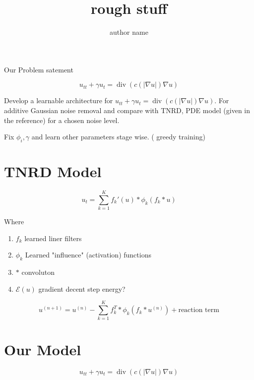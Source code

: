 \documentclass{report}
\title{rough stuff}
\author{author name}
\date{}
\begin{document}
\maketitle

{\huge Our Problem satement}



\begin{equation}
	u_{tt} + \gamma u_t = \operatorname{div}(c(|\nabla u|)\nabla u)
\end{equation}

Develop a learnable architecture for \(u_{tt} + \gamma u_t = \operatorname{div}(c(|\nabla u|)\nabla u)\). For additive Gaussian noise removal and compare with TNRD, PDE model (given in the reference) for a chosen noise level.

Fix $\phi_i, \gamma$ and learn other parameters stage wise. ( \therefore greedy training)

\section{TNRD Model}

\begin{equation}
	u_t = \sum_{k=1}^{K} f_k'(u) * \phi_k(f_k * u)
\end{equation}

Where
\begin{enumerate}
	\item{$f_k$} learned liner filters
	\item{$\phi_k$} Learned "influence" (activation) functions
	\item{$*$} convoluton
	\item{$\mathcal{E}(u)$} gradient decent step energy?
\end{enumerate}

\begin{equation}
	u^{(n+1)} = u^{(n)} - \sum_{k=1}^{K} f_k^T * \phi_k(f_k * u^{(n)}) + \text{reaction term}
\end{equation}


\pagebreak

\section{Our Model}

\begin{equation}
	u_{tt} + \gamma u_t = \operatorname{div}(c(|\nabla u|)\nabla u)
\end{equation}
\end{document}
